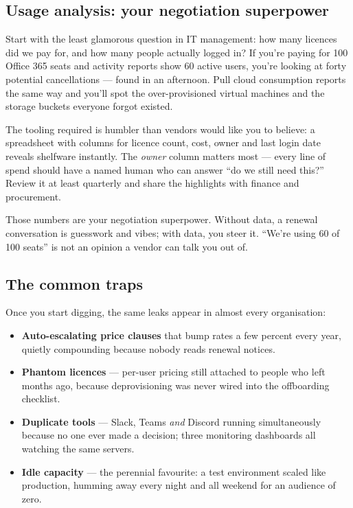 \subsection{Usage analysis: your negotiation superpower}


Start with the least glamorous question in IT management: how many licences did we pay for, and how many people actually logged in? If you're paying for 100 Office 365 seats and activity reports show 60 active users, you're looking at forty potential cancellations — found in an afternoon. Pull cloud consumption reports the same way and you'll spot the over-provisioned virtual machines and the storage buckets everyone forgot existed.


The tooling required is humbler than vendors would like you to believe: a spreadsheet with columns for licence count, cost, owner and last login date reveals shelfware instantly. The \emph{owner} column matters most — every line of spend should have a named human who can answer ``do we still need this?'' Review it at least quarterly and share the highlights with finance and procurement.


Those numbers are your negotiation superpower. Without data, a renewal conversation is guesswork and vibes; with data, you steer it. ``We're using 60 of 100 seats'' is not an opinion a vendor can talk you out of.



\subsection{The common traps}


Once you start digging, the same leaks appear in almost every organisation:


\begin{itemize}[leftmargin=*]
\item \textbf{Auto-escalating price clauses} that bump rates a few percent every year, quietly compounding because nobody reads renewal notices.
\item \textbf{Phantom licences} — per-user pricing still attached to people who left months ago, because deprovisioning was never wired into the offboarding checklist.
\item \textbf{Duplicate tools} — Slack, Teams \emph{and} Discord running simultaneously because no one ever made a decision; three monitoring dashboards all watching the same servers.
\item \textbf{Idle capacity} — the perennial favourite: a test environment scaled like production, humming away every night and all weekend for an audience of zero.
\end{itemize}

